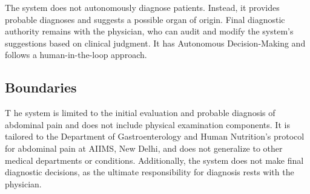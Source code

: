 The system does not autonomously diagnose patients. Instead, it provides probable diagnoses and suggests a possible organ of origin. Final diagnostic authority remains with the physician, who can audit and modify the system's suggestions based on clinical judgment. It has Autonomous Decision-Making and follows a human-in-the-loop approach.

\subsection{Boundaries}
\lettrine{T}{ }he system is limited to the initial evaluation and probable diagnosis of abdominal pain and does not include physical examination components. It is tailored to the Department of Gastroenterology and Human Nutrition's protocol for abdominal pain at AIIMS, New Delhi, and does not generalize to other medical departments or conditions. Additionally, the system does not make final diagnostic decisions, as the ultimate responsibility for diagnosis rests with the physician.